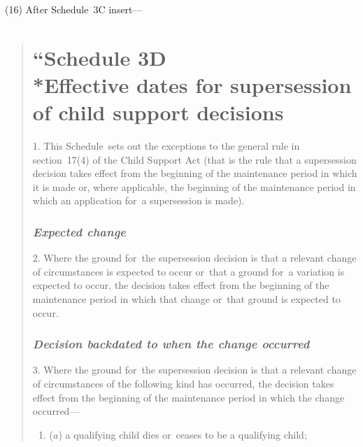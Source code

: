 \documentclass[12pt,a4paper]{article}
\begin{document}

(16) After Schedule~3C insert—
\begin{quotation}
\part*{\noindent “Schedule 3D\\*Effective dates for supersession of child support decisions}

1.  This Schedule~sets out the exceptions to the general rule in section~17(4) of the Child Support Act (that is the rule that a supersession decision takes effect from the beginning of the maintenance period in which it is made or, where applicable, the beginning of the maintenance period in which an application for~a supersession is made).

\section*{\itshape Expected change}

2.  Where the ground for~the supersession decision is that a relevant change of circumstances is expected to occur or~that a ground for~a variation is expected to occur, the decision takes effect from the beginning of the maintenance period in which that change or~that ground is expected to occur.

\section*{\itshape Decision backdated to when the change occurred}

3.  Where the ground for~the supersession decision is that a relevant change of circumstances of the following kind has occurred, the decision takes effect from the beginning of the maintenance period in which the change occurred—
\begin{enumerate}\item[]
($a$) a qualifying child dies or~ceases to be a qualifying child;


\end{enumerate}
\end{quotation}
\end{document}
